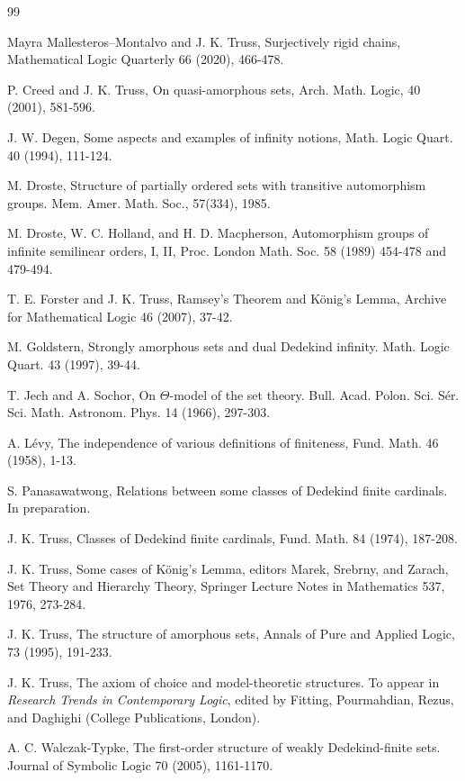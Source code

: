 \documentclass[a4paper,reqno]{amsart}
\numberwithin{equation}{section}
\begin{document}
\begin{thebibliography}{99}

 Mayra Mallesteros--Montalvo and J. K. Truss, Surjectively rigid chains, 
Mathematical Logic Quarterly 66 (2020), 466-478.

 P. Creed and J. K. Truss, On quasi-amorphous sets, Arch. Math. Logic, 40 (2001), 581-596.

  J. W. Degen, Some aspects and examples of infinity notions, Math. Logic Quart. 40 (1994), 111-124.

 M. Droste, Structure of partially ordered sets with transitive automorphism
groups. Mem. Amer. Math. Soc., 57(334), 1985.

 M. Droste, W. C. Holland, and H. D. Macpherson, Automorphism groups of
infinite semilinear orders, I, II, Proc. London Math. Soc. 58 (1989) 454-478 and 479-494.

 T. E. Forster and J. K. Truss, Ramsey's Theorem and K\"onig's Lemma, Archive for Mathematical Logic 46 (2007), 37-42.

 M. Goldstern, Strongly amorphous sets and dual Dedekind infinity. Math.
Logic Quart. 43 (1997), 39-44.

 T. Jech and A. Sochor, On $\Theta$-model of the set theory. Bull. Acad. Polon. Sci.
S\'er. Sci. Math. Astronom. Phys. 14 (1966), 297-303.

 A. L\'evy, The independence of various definitions of finiteness, Fund. Math. 46 (1958), 1-13.

 S. Panasawatwong, Relations between some classes of Dedekind finite cardinals. In preparation.

 J. K. Truss, Classes of Dedekind finite cardinals, Fund. Math. 84 (1974), 187-208.

 J. K. Truss, Some cases of K\"onig's Lemma, editors Marek, Srebrny, and Zarach, Set Theory and 
Hierarchy Theory, Springer Lecture Notes in Mathematics 537, 1976, 273-284.

 J. K. Truss, The structure of amorphous sets, Annals of Pure and Applied Logic, 73 (1995), 191-233.

 J. K. Truss, The axiom of choice and model-theoretic structures. To appear in {\em Research Trends in Contemporary
Logic}, edited by Fitting, Pourmahdian, Rezus, and Daghighi (College Publications, London).

 A. C. Walczak-Typke, The first-order structure of weakly Dedekind-finite sets.
Journal of Symbolic Logic 70 (2005), 1161-1170.

\end{thebibliography}
\end{document}
